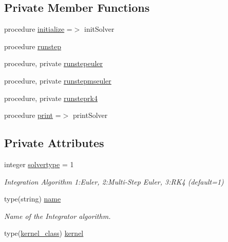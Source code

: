\subsection*{Private Member Functions}
\begin{DoxyCompactItemize}
\item 
procedure \mbox{\hyperlink{structsolver__mod_1_1solver__class_a9ac72acd3e4fbb8881c7eaabe9e3d585}{initialize}} =$>$ init\+Solver
\item 
procedure \mbox{\hyperlink{structsolver__mod_1_1solver__class_a54ee0f169b626d3fb484d79cce91c3be}{runstep}}
\item 
procedure, private \mbox{\hyperlink{structsolver__mod_1_1solver__class_a74396adb5f6525ecd691ff70912ee35e}{runstepeuler}}
\item 
procedure, private \mbox{\hyperlink{structsolver__mod_1_1solver__class_ac8048d91cd5b808369a84f08f63feb7d}{runstepmseuler}}
\item 
procedure, private \mbox{\hyperlink{structsolver__mod_1_1solver__class_a58c86ed273b0b9141e74cc55b59377a3}{runsteprk4}}
\item 
procedure \mbox{\hyperlink{structsolver__mod_1_1solver__class_ac61135f89371079744ac9b5fd8da8a41}{print}} =$>$ print\+Solver
\end{DoxyCompactItemize}
\subsection*{Private Attributes}
\begin{DoxyCompactItemize}
\item 
integer \mbox{\hyperlink{structsolver__mod_1_1solver__class_a6bd9eec5b3a11d34981b191b54944ac4}{solvertype}} = 1
\begin{DoxyCompactList}\small\item\em Integration Algorithm 1\+:Euler, 2\+:Multi-\/\+Step Euler, 3\+:R\+K4 (default=1) \end{DoxyCompactList}\item 
type(string) \mbox{\hyperlink{structsolver__mod_1_1solver__class_a0a2677f8e0403b82095b826378f9439d}{name}}
\begin{DoxyCompactList}\small\item\em Name of the Integrator algorithm. \end{DoxyCompactList}\item 
type(\mbox{\hyperlink{structkernel__mod_1_1kernel__class}{kernel\+\_\+class}}) \mbox{\hyperlink{structsolver__mod_1_1solver__class_aa27d4f6ba342d40eaa425a2da8cb19b9}{kernel}}
\end{DoxyCompactItemize}


